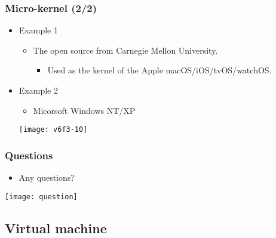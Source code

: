 \documentclass[CJKutf8,xcolor=pdftex,dvipsnames,table]{beamer}
\begin{document}
\begin{CJK*}{UTF8}{song}
  \begin{frame}
    \frametitle{Micro-kernel (2/2)} \pause
    \begin{itemize}
    \item{Example 1} \pause
      \begin{itemize}
      \item{The open source  from Carnegie Mellon University.} \pause
        \begin{itemize}
        \item{Used as the kernel of the Apple macOS/iOS/tvOS/watchOS.} \pause
        \end{itemize}
      \end{itemize}
    \item{Example 2} \pause
      \begin{itemize}
      \item{Micorsoft Windows NT/XP} \pause
      \end{itemize}
      \begin{center}
        \texttt{[image: v6f3-10]}
      \end{center}
    \end{itemize}
  \end{frame}
  
  \begin{frame}
    \frametitle{Questions}
    \begin{itemize}
    \item{Any questions?}
    \end{itemize}
    \begin{center}
      \texttt{[image: question]}
    \end{center}
  \end{frame}
  
  \subsection{Virtual machine}


\end{CJK*}
\end{document}
